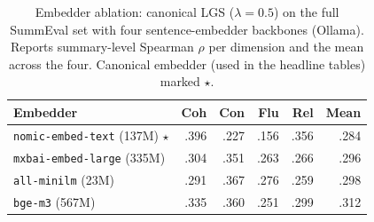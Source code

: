 \begin{table}[t]
\centering
\caption{Embedder ablation: canonical LGS ($\lambda=0.5$) on the full SummEval set with four sentence-embedder backbones (Ollama). Reports summary-level Spearman $\rho$ per dimension and the mean across the four. Canonical embedder (used in the headline tables) marked $\star$.}
\label{tab:ablation_embedder}
\begin{tabular}{lrrrrr}
\toprule
Embedder & Coh & Con & Flu & Rel & Mean \\
\midrule
\texttt{nomic-embed-text} (137M) $\star$ & .396 & .227 & .156 & .356 & .284 \\
\texttt{mxbai-embed-large} (335M) & .304 & .351 & .263 & .266 & .296 \\
\texttt{all-minilm} (23M) & .291 & .367 & .276 & .259 & .298 \\
\texttt{bge-m3} (567M) & .335 & .360 & .251 & .299 & .312 \\
\bottomrule
\end{tabular}
\end{table}
